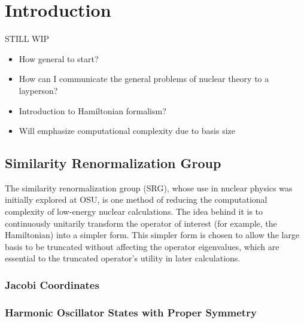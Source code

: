 \chapter{Introduction}

STILL WIP

\begin{itemize}
    \item{How general to start?}
    \item{How can I communicate the general problems of nuclear theory to a layperson?}
    \item{Introduction to Hamiltonian formalism?}
    \item{Will emphasize computational complexity due to basis size}
\end{itemize}


\section{Similarity Renormalization Group}

The similarity renormalization group (SRG), whose use in nuclear physics was initially explored at OSU, is one method of reducing the computational complexity of low-energy nuclear calculations. The idea behind it is to continuously unitarily transform the operator of interest (for example, the Hamiltonian) into a simpler form. This simpler form is chosen to allow the large basis to be truncated without affecting the operator eigenvalues, which are essential to the truncated operator's utility in later calculations.

\subsection{Jacobi Coordinates}

\subsection{Harmonic Oscillator States with Proper Symmetry}
